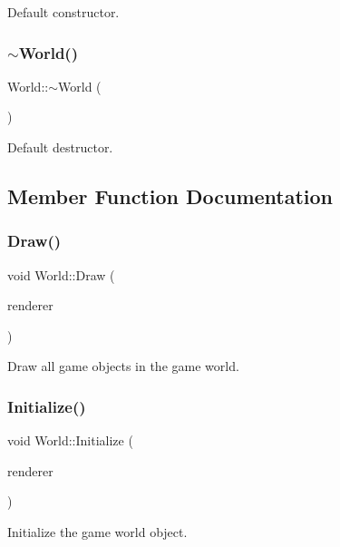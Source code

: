 Default constructor. \mbox{\label{class_world_a8c73fba541a5817fff65147ba47cd827}} 
\subsubsection{\texorpdfstring{$\sim$\+World()}{~World()}}
{\footnotesize\ttfamily World\+::$\sim$\+World (\begin{DoxyParamCaption}{ }\end{DoxyParamCaption})}

Default destructor. 

\subsection{Member Function Documentation}
\mbox{\label{class_world_ac42466df32c2d68dc36c41b3e1e9cdad}} 
\subsubsection{\texorpdfstring{Draw()}{Draw()}}
{\footnotesize\ttfamily void World\+::\+Draw (\begin{DoxyParamCaption}\item[{S\+D\+L\+\_\+\+Renderer $\ast$}]{renderer }\end{DoxyParamCaption})}

Draw all game objects in the game world. \mbox{\label{class_world_a72d413fcf9f301d1e2613844fd60f058}} 
\subsubsection{\texorpdfstring{Initialize()}{Initialize()}}
{\footnotesize\ttfamily void World\+::\+Initialize (\begin{DoxyParamCaption}\item[{S\+D\+L\+\_\+\+Renderer $\ast$}]{renderer }\end{DoxyParamCaption})}

Initialize the game world object. \mbox{\label{class_world_afdb5329b573ec0d74ba38e4641977705}} 
